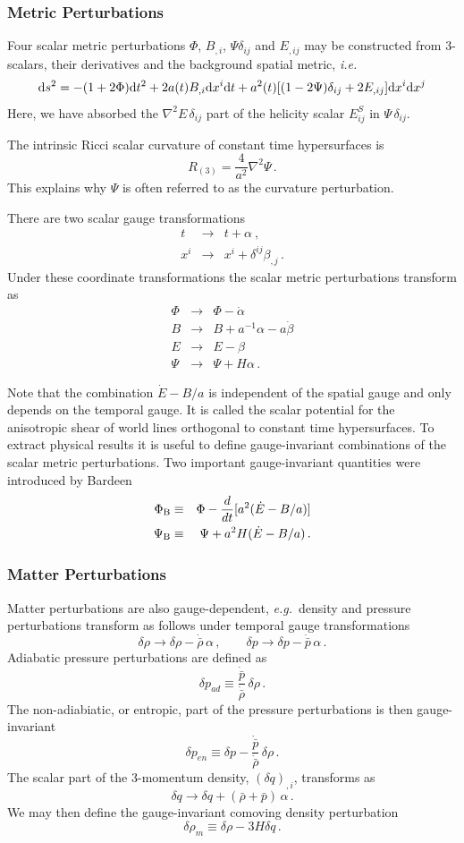 \documentclass[12pt,letterpaper,rotate]{article}
\def\beq{\begin{equation}}
\def\eeq{\end{equation}}
\def\bea{\begin{eqnarray}}
\def\eea{\end{eqnarray}}
\def\d{{\rm d}}
\begin{document}
{\subsubsection{Metric Perturbations}

Four scalar metric perturbations $\Phi$, $B_{,i}$, $\Psi \delta_{ij}$ and $E_{, ij}$ may be constructed from 3-scalars, their derivatives and the background spatial metric, {\it i.e.}
\beq
\label{equ:Smetric}
\d s^2 = -(1+2 \Phi) \d t^2 + 2 a(t) B_{,i} \d x^i \d t + a^2(t)[(1-2\Psi) \delta_{ij} + 2 E_{, ij}] \d x^i \d x^j
\eeq
Here, we have absorbed the $\nabla^2 E\, \delta_{ij}$ part of the helicity scalar $E_{ij}^{S}$ in $\Psi\, \delta_{ij}$.

The intrinsic Ricci scalar curvature of constant time hypersurfaces is
\beq
R_{(3)} = \frac{4}{a^2} \nabla^2 \Psi\, .
\eeq
This explains why $\Psi$ is often referred to as the curvature perturbation.

There are two scalar gauge transformations
\bea
t &\to& t + \alpha\ , \\
x^i &\to& x^i + \delta^{ij} \beta_{,j}\, .
\eea
Under these coordinate transformations the scalar metric perturbations transform as
\bea
\Phi &\to& \Phi - \dot \alpha \\
B &\to & B + a^{-1} \alpha - a \dot \beta \\
E &\to & E - \beta \\
\Psi &\to& \Psi + H \alpha \, .
\eea

Note that the combination $\dot E - B/a$ is independent of the spatial gauge and only depends on the temporal gauge. It is called the scalar potential for the anisotropic shear of world lines orthogonal to constant time hypersurfaces.
To extract physical results it is useful to define gauge-invariant combinations of the scalar metric perturbations. Two important gauge-invariant quantities were introduced by Bardeen \cite{Bardeen:1980kt}
\bea
\Phi_{\rm B} &\equiv& \Phi - \frac{d}{dt} [a^2 (\dot E - B/a)] \\
\Psi_{\rm B} &\equiv& \Psi + a^2 H(\dot E - B/a)\, .
\eea

\subsubsection{Matter Perturbations}

Matter perturbations are also gauge-dependent, {\it e.g.}~density and pressure perturbations transform as follows under temporal gauge transformations
\beq
\delta \rho \to \delta \rho - \dot {\bar \rho}\, \alpha\, , \qquad \delta p \to \delta p- \dot {\bar p}\, \alpha\, .
\eeq
Adiabatic pressure perturbations are defined as
\beq
\delta p_{ad} \equiv \frac{\dot {\bar p}}{\dot {\bar \rho}}\, \delta \rho\, .
\eeq 
The non-adiabiatic, or entropic, part of the pressure perturbations is then gauge-invariant
\beq
\delta p_{en} \equiv \delta p - \frac{\dot {\bar p}}{\dot {\bar \rho}} \, \delta \rho\, .
\eeq
The scalar part of the 3-momentum density, $(\delta q)_{,i}$, transforms as
\beq
\delta q \to \delta q +(\bar \rho + \bar p)\, \alpha\, .
\eeq
We may then define the gauge-invariant comoving density perturbation
\beq
\delta \rho_m \equiv \delta \rho - 3 H \delta q\, .
\eeq

}
\end{document}
